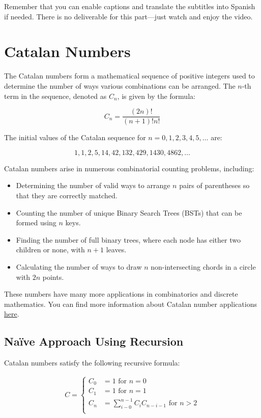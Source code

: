 \documentclass[11pt]{article}
\begin{document}
Remember that you can enable captions and translate the subtitles into Spanish if needed. There is no deliverable for this part—just watch and enjoy the video.

\section{Catalan Numbers}
The Catalan numbers form a mathematical sequence of positive integers used to determine the number of ways various combinations can be arranged. The $n$-th term in the sequence, denoted as $C_n$, is given by the formula:

\[
C_n = \frac{(2n)!}{(n+1)!n!}
\]

The initial values of the Catalan sequence for $n = 0, 1, 2, 3, 4, 5, \dots$ are:

\[
1, 1, 2, 5, 14, 42, 132, 429, 1430, 4862, \dots
\]

Catalan numbers arise in numerous combinatorial counting problems, including:

\begin{itemize}
    \item Determining the number of valid ways to arrange $n$ pairs of parentheses so that they are correctly matched.
    \item Counting the number of unique Binary Search Trees (BSTs) that can be formed using $n$ keys.
    \item Finding the number of full binary trees, where each node has either two children or none, with $n+1$ leaves.
    \item Calculating the number of ways to draw $n$ non-intersecting chords in a circle with $2n$ points.
\end{itemize}

These numbers have many more applications in combinatorics and discrete mathematics. You can find more information about Catalan number applications \href{https://www.geeksforgeeks.org/applications-of-catalan-numbers/}{here}.

\subsection{Naïve Approach Using Recursion}

Catalan numbers satisfy the following recursive formula:

\begin{equation*}
    \begin{align}
    C =
        \begin{cases}
            C_0 &= 1 \text{ for } n = 0 \\
            C_1 &= 1 \text{ for } n = 1 \\
            C_n &= \sum_{i - 0}^{n - 1}C_i C_{n - i - 1} \text{ for } n > 2 \\
        \end{cases}
    \end{align}
\end{equation*}
\end{document}
